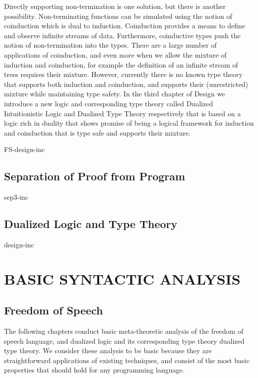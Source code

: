 \documentclass[phd,dedicationpage,ackpage,epigraphpage,figures]{uithesis}
\begin{document}
Directly supporting non-termination is one solution, but there is
another possibility.  Non-terminating functions can be simulated using
the notion of coinduction which is dual to induction.  Coinduction
provides a means to define and observe infinite streams of data.
Furthermore, coinductive types push the notion of non-termination into
the types. There are a large number of applications of coinduction,
and even more when we allow the mixture of induction and coinduction,
for example the definition of an infinite stream of trees requires
their mixture.  However, currently there is no known type theory that
supports both induction and coinduction, and supports their
(unrestricted) mixture while maintaining type safety.  In the third
chapter of Design we introduce a new logic and corresponding type
theory called Dualized Intuitionistic Logic and Dualized Type Theory
respectively that is based on a logic rich in duality that shows
promise of being a logical framework for induction and coinduction
that is type safe and supports their mixture.

{FS-design-inc}

\chapter{Separation of Proof from Program}
\label{chap:separation_of_proof_from_program}
{sep3-inc}
\chapter{Dualized Logic and Type Theory}
\label{chap:dualized_type_theory_de}
{design-inc}

\part{BASIC SYNTACTIC ANALYSIS}
\label{part:basic-analysis}

\chapter{Freedom of Speech}
\label{chap:freedom_of_speech_anal}
The following chapters conduct basic meta-theoretic analysis of the
freedom of speech language, and dualized logic and its corresponding
type theory dualized type theory.  We consider these analysis to be
basic because they are straightforward applications of existing
techniques, and consist of the most basic properties that should hold
for any programming language.
\end{document}
